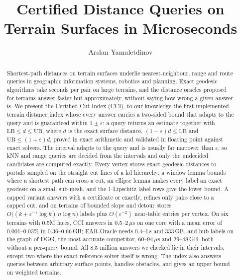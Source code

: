 \documentclass[sigconf,nonacm,screen]{acmart}
\newcommand{\cci}{CCI\xspace}
\newcommand{\LB}{\mathrm{LB}}
\newcommand{\UB}{\mathrm{UB}}
\newcommand{\eps}{\varepsilon}
\begin{document}
\title{Certified Distance Queries on Terrain Surfaces in Microseconds}

\author{Arslan Yamaletdinov}

\begin{abstract}
Shortest-path distances on terrain surfaces underlie nearest-neighbour, range and route queries in geographic
information systems, robotics and planning. Exact geodesic algorithms take seconds per pair on large terrains, and
the distance oracles proposed for terrains answer faster but approximately, without saying how wrong a given
answer is. We present the Certified Cut Index (\cci), to our knowledge the first implemented terrain distance index whose
every answer carries a two-sided bound that adapts to the query and is guaranteed within $1\pm\eps$: a query returns an estimate together with $\LB\le d\le\UB$, where $d$
is the exact surface distance, $(1-\eps)d\le\LB$ and $\UB\le(1+\eps)d$, proved in exact arithmetic and validated in
floating point against exact solvers. The interval adapts to the query and is usually far narrower than $\eps$, so
kNN and range queries are decided from the intervals and only the undecided candidates are computed exactly. Every
vertex stores exact geodesic distances to portals sampled on the straight cut lines of a kd hierarchy: a window
lemma bounds where a shortest path can cross a cut, an ellipse lemma makes every label an exact geodesic on a small
sub-mesh, and the 1-Lipschitz label rows give the lower bound. A capped variant answers with a certificate or
exactly, refines only pairs close to a capped cut, and on terrains of bounded slope and detour stores
$O\big((k+\eps^{-1}\log k)\,n\log n\big)$ labels plus $O(\eps^{-2})$ near-table entries per vertex. On six terrains
with 0.5M faces, \cci answers in 0.5--2\,$\mu$s on one core with a mean error of 0.001--0.03\% in 0.36--0.66\,GB;
EAR-Oracle needs 0.4--1\,s and 333\,GB, and hub labels on the graph of DGG, the most accurate competitor,
60--94\,$\mu$s and 29--48\,GB, both without a per-query bound. All 8.5 million answers we checked lie in their
intervals, except two where the exact reference solver itself is wrong. The index also answers queries between
arbitrary surface points, handles obstacles, and gives an upper bound on weighted terrains.
\end{abstract}

\maketitle
\end{document}
